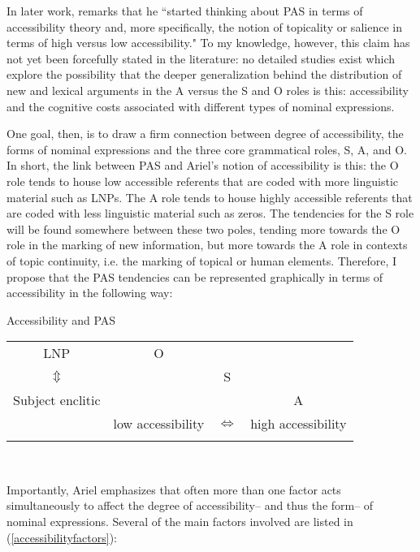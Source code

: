 In later work, \citet[194]{dubois2006} remarks that he ``started thinking about PAS in terms of accessibility theory and, more specifically, the notion of topicality or salience in terms of high versus low accessibility." To my knowledge, however, this claim has not yet been forcefully stated in the literature: no detailed studies exist which explore the possibility that the deeper generalization behind the distribution of new and lexical arguments in the A versus the S and O roles is this: accessibility and the cognitive costs associated with different types of nominal expressions.

One goal, then, is to draw a firm connection between degree of accessibility, the forms of nominal expressions and the three core grammatical roles, S, A, and O. In short, the link between PAS and Ariel's notion of accessibility is this: the O role tends to house low accessible referents that are coded with more linguistic material such as LNPs. The A role tends to house highly accessible referents that are coded with less linguistic material such as zeros. The tendencies for the S role will be found somewhere between these two poles, tending more towards the O role in the marking of new information, but more towards the A role in contexts of topic continuity, i.e. the marking of topical or human elements. Therefore, I propose that the PAS tendencies can be represented graphically in terms of accessibility in the following way: 

\ea\label{graphic} Accessibility and PAS
\begin{center}
\begin{tabular}{ c  c  c  c }
\lsptoprule
LNP & O &  & \\

$\Updownarrow$ &  &  S &   \\

Subject enclitic &  &  & A  \\

\midrule

\midrule
 & low accessibility  &  $\Leftrightarrow$ & high accessibility \\

\lspbottomrule
\end{tabular}\\
\end{center}

\z

Importantly, Ariel emphasizes that often more than one factor acts simultaneously to affect the degree of accessibility-- and thus the form-- of nominal expressions. Several of the main factors involved are listed in (\ref{accessibilityfactors}): 

